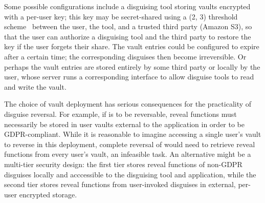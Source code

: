 %
Some possible configurations include a disguising tool storing vaults encrypted with a per-user key; this key
may be secret-shared using a (2, 3) threshold scheme~\cite{secretsharing} between the user, the
tool, and a trusted third party (\eg Amazon S3), so that the user can authorize a disguising tool and the
third party to restore the key if the user forgets their share.
%
The vault entries could be configured to expire after a certain time; the corresponding disguises
then become irreversible.
%
Or perhaps the vault entries are stored entirely by some third party or locally by the user, whose
server runs a corresponding interface to allow disguise tools to read and write the vault.

The choice of vault deployment has serious consequences for the practicality of disguise reversal.
For example, if \gdpr is to be reversable, reveal functions must necessarily be stored in user vaults external
to the application in order to be GDPR-compliant.
While it is reasonable to imagine accessing a single user's vault to reverse \gdpr in this
deployment, complete reversal of \ca would need to retrieve reveal functions from every user's vault, an infeasible task.
An alternative might be a multi-tier security design: the first tier stores reveal functions of
non-GDPR disguises locally and acccessible to the disguising tool and application, while the second
tier stores reveal functions from user-invoked disguises in external, per-user encrypted storage.

